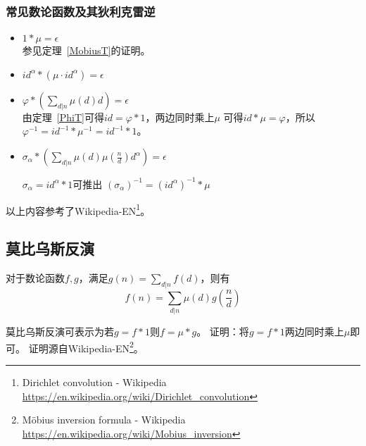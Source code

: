 \subsubsection{常见数论函数及其狄利克雷逆}
\begin{itemize}
	\item $1*\mu=\epsilon$\\
	      参见定理~\ref{MobiusT}的证明。
	\item $id^\alpha*(\mu\cdot id^\alpha)=\epsilon$
	\item $\displaystyle \varphi*(\sum_{d|n}{\mu(d)d})=\epsilon$\\
	      由定理~\ref{PhiT}可得$id=\varphi*1$，两边同时乘上$\mu$
	      可得$id*\mu=\varphi$，所以$\varphi^{-1}=id^{-1}*\mu^{-1}=id^{-1}*1$。
	\item $\sigma_\alpha*(\sum_{d|n}{\mu(d)\mu(\frac{n}{d})d^\alpha})=\epsilon$

	      $\sigma_\alpha=id^\alpha*1$可推出
	      $(\sigma_\alpha)^{-1}=(id^\alpha)^{-1}*\mu$
\end{itemize}
以上内容参考了Wikipedia-EN\footnote{Dirichlet convolution - Wikipedia\\
	\url{https://en.wikipedia.org/wiki/Dirichlet\_convolution}}。
\subsection{莫比乌斯反演}
\begin{theorem}
	对于数论函数$f,g$，满足$\displaystyle g(n)=\sum_{d|n}f(d)$，则有
	\begin{displaymath}
		f(n)=\sum_{d|n}\mu(d)g(\frac{n}{d})
	\end{displaymath}
\end{theorem}
莫比乌斯反演可表示为若$g=f*1$则$f=\mu*g$。
证明：将$g=f*1$两边同时乘上$\mu$即可。
证明源自Wikipedia-EN\footnote{Möbius inversion formula - Wikipedia\\
\url{https://en.wikipedia.org/wiki/Mobius_inversion}}。
